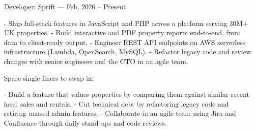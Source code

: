 Developer: Sprift — Feb. 2026 – Present

  - Ship full-stack features in JavaScript and PHP across a platform serving 30M+ UK properties.
  - Build interactive and PDF property reports end-to-end, from data to client-ready output.
  - Engineer REST API endpoints on AWS serverless infrastructure (Lambda, OpenSearch, MySQL).
  - Refactor legacy code and review changes with senior engineers and the CTO in an agile team.

  Spare single-liners to swap in:

  - Build a feature that values properties by comparing them against similar recent local sales and rentals.
  - Cut technical debt by refactoring legacy code and retiring unused admin features.
  - Collaborate in an agile team using Jira and Confluence through daily stand-ups and code reviews.